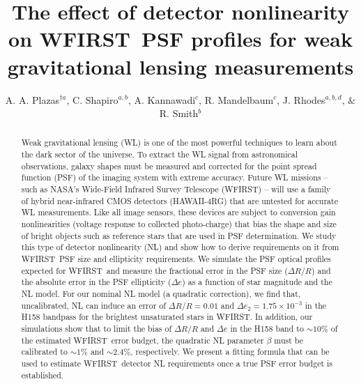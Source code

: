 \documentclass[11pt,preprint,flushrt]{aastex}
\begin{document}
\newcommand {\gs} {{\tt{GalSim}}}  
\newcommand {\wf} {WFIRST}  
\newcommand {\wfa} {WFIRST}  
\newcommand {\optical} {{\tt{OpticalPSF}}} 
\newcommand {\gauss} {{\tt{Gaussian}}} 


\title{The effect of detector nonlinearity on \wfa\ PSF profiles for weak gravitational lensing measurements}
\author{A. A. Plazas$^{\dagger a}$, C. Shapiro$^{a,b}$, A. Kannawadi$^c$, R. Mandelbaum$^c$, J. Rhodes$^{a,b,d}$, $\&$ R. Smith$^b$  }

\begin{abstract}
Weak gravitational lensing (WL) is one of the most powerful techniques to learn about the dark sector of the universe. To extract the WL signal from astronomical observations, galaxy shapes must be measured and corrected for the point spread function (PSF) of the imaging system with extreme accuracy. Future WL missions -- such as NASA's Wide-Field Infrared Survey Telescope (WFIRST) -- will use a family of hybrid near-infrared CMOS detectors (HAWAII-4RG) that are untested for accurate WL measurements.  Like all image sensors, these devices are subject to conversion gain nonlinearities (voltage response to collected photo-charge) that bias the shape and size of bright objects such as reference stars that are used in PSF determination.
We study this type of detector nonlinearity (NL) and show how to derive requirements on it from \wf\ PSF size and ellipticity requirements. We simulate the PSF optical profiles expected for \wf\, and measure the fractional error in the PSF size ($\Delta R/R$) and the absolute error in the PSF ellipticity ($\Delta e$) as a function of star magnitude and the NL model. For our nominal NL model (a quadratic correction), we find that, uncalibrated, NL can induce an error of $\Delta R/R=0.01$ and $\Delta e_2=1.75\times 10^{-3}$ in the H158 bandpass for the brightest unsaturated stars in \wf. In addition, our simulations show that to limit the bias of $\Delta R/R$ and $\Delta e$ in the H158 band to $\sim 10\%$ of the estimated \wf\ error budget, the quadratic NL parameter $\beta$ must be calibrated to $\sim1\%$ and $\sim 2.4\%$, respectively. We present a fitting formula that can be used to estimate \wf\ detector NL requirements once a true PSF error budget is established.
\end{abstract}
\end{document}
